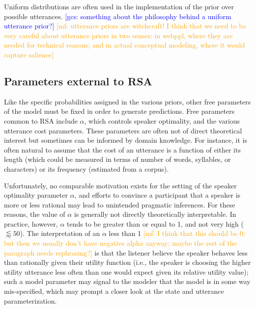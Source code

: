 \documentclass{sp}
\newcommand{\gcs}[1]{\textcolor{blue}{[gcs: #1]}}
\newcommand{\mf}[1]{\textcolor{orange}{[mf: #1]}}
\newcommand{\mht}[1]{\textcolor{purple}{[mht: #1]}}
\begin{document}
Uniform distributions are often used in the implementation of the prior over possible utterances. \gcs{something about the philosophy behind a uniform utterance prior?} \mf{utterance priors are witchcraft! I think that we need to be very careful about utterance priors in two senses: in webppl, where they are needed for technical reasons; and in actual conceptual modeling, where it would capture salience}


%


\subsection{Parameters external to RSA}

Like the specific probabilities assigned in the various priors, other free parameters of the model must be fixed in order to generate predictions. Free parameters common to RSA include $\alpha$, which controls speaker optimality, and the various utterance cost parameters. These parameters are often not of direct theoretical interest but sometimes can be informed by domain knowledge. For instance, it is often natural to assume that the cost of an utterance is a function of either its length  (which could be measured in terms of number of words, syllables, or characters) or its frequency (estimated from a corpus). 

Unfortunately,  no comparable motivation exists for the setting of the speaker optimality parameter $\alpha$, and efforts to convince a participant that a speaker is more or less rational may lead to unintended pragmatic inferences. For these reasons, the value of $\alpha$ is generally not directly theoretically interpretable. In practice, however, $\alpha$ tends to be greater than or equal to 1, and not very high ($\lessapprox 50$). The interpretation of an $\alpha$ less than 1 \mf{I think that this should be 0; but then we usually don't have negative alpha anyway; maybe the rest of the paragraph needs rephrasing?} is that the listener believe the speaker behaves less than rationally given their utility function (i.e., the speaker is choosing the higher utility utterance less often than one would expect given its relative utility value); such a model parameter may signal to the modeler that the model is in some way mis-specified, which may prompt a closer look at the state and utterance parameterization. 
\end{document}
